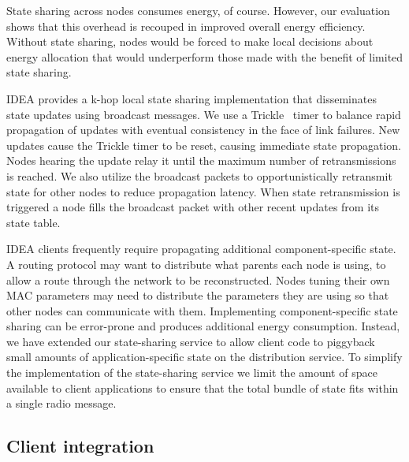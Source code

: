 State sharing across nodes consumes energy, of course. However, our
evaluation shows that this overhead is recouped in improved overall energy
efficiency.  Without state sharing, nodes would be forced to make local
decisions about energy allocation that would underperform those made with the
benefit of limited state sharing.

IDEA provides a k-hop local state sharing implementation that disseminates
state updates using broadcast messages. We use a Trickle~\cite{trickle} timer
to balance rapid propagation of updates with eventual consistency in the face
of link failures. New updates cause the Trickle timer to be reset, causing
immediate state propagation. Nodes hearing the update relay it until the
maximum number of retransmissions is reached. We also utilize the broadcast
packets to opportunistically retransmit state for other nodes to reduce
propagation latency. When state retransmission is triggered a node fills
the broadcast packet with other recent updates from its state table.

IDEA clients frequently require propagating additional component-specific
state. A routing protocol may want to distribute what parents each node is
using, to allow a route through the network to be reconstructed. Nodes tuning
their own MAC parameters may need to distribute the parameters they are using so
that other nodes can communicate with them. Implementing component-specific
state sharing can be error-prone and produces additional energy consumption.
Instead, we have extended our state-sharing service to allow client code to
piggyback small amounts of application-specific state on the distribution
service. To simplify the implementation of the state-sharing service we limit
the amount of space available to client applications to ensure that the total
bundle of state fits within a single radio message.

\subsection{Client integration}

